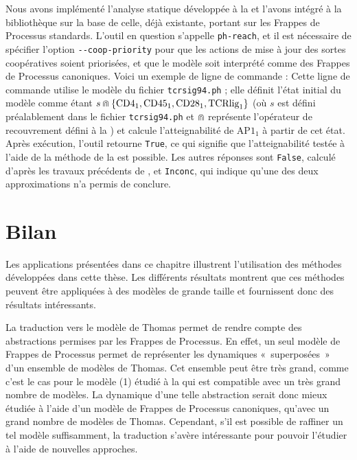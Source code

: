 Nous avons implémenté l'analyse statique développée à la 
et l'avons intégré à la bibliothèque \Pint
sur la base de celle, déjà existante, portant sur les Frappes de Processus standards.
L'outil en question s'appelle \texttt{ph-reach}, et il est nécessaire de spécifier l'option
\texttt{-{}-coop-priority}
pour que les actions de mise à jour des sortes coopératives soient priorisées,
et que le modèle soit interprété comme des Frappes de Processus canoniques.
Voici un exemple de ligne de commande :
Cette ligne de commande utilise le modèle du fichier \texttt{tcrsig94.ph} ;
elle définit l'état initial du modèle comme étant
$s \Cap \{ \text{CD4}_1, \text{CD45}_1, \text{CD28}_1, \text{TCRlig}_1 \}$
(où $s$ est défini préalablement dans le fichier \texttt{tcrsig94.ph}
et $\Cap$ représente l'opérateur de recouvrement défini à la )
et calcule l'atteignabilité de $\text{AP1}_1$ à partir de cet état.
Après exécution, l'outil retourne \texttt{True}, ce qui signifie que l'atteignabilité
testée à l'aide de la méthode de la  est possible.
Les autres réponses sont \texttt{False},
calculé d'après les travaux précédents de ,
et \texttt{Inconc}, qui indique qu'une des deux approximations n'a permis de conclure.



\section{Bilan}

Les applications présentées dans ce chapitre illustrent l'utilisation des méthodes
développées dans cette thèse.
Les différents résultats montrent que ces méthodes peuvent être appliquées à des modèles
de grande taille et fournissent donc des résultats intéressants.

\myskip

La traduction vers le modèle de Thomas permet de rendre compte des abstractions
permises par les Frappes de Processus.
En effet, un seul modèle de Frappes de Processus permet de représenter les dynamiques
«~superposées~» d'un ensemble de modèles de Thomas.
Cet ensemble peut être très grand, comme c'est le cas pour le modèle (1) étudié à la
 qui est compatible avec un très grand nombre de modèles.
La dynamique d'une telle abstraction serait donc mieux étudiée à l'aide d'un modèle
de Frappes de Processus canoniques, qu'avec un grand nombre de modèles de Thomas.
Cependant, s'il est possible de raffiner un tel modèle suffisamment, la traduction
s'avère intéressante pour pouvoir l'étudier à l'aide de nouvelles approches.

